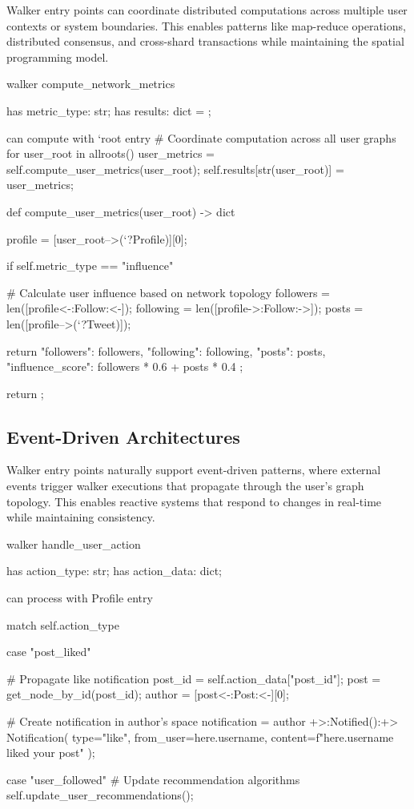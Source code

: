 Walker entry points can coordinate distributed computations across multiple user contexts or system boundaries. This enables patterns like map-reduce operations, distributed consensus, and cross-shard transactions while maintaining the spatial programming model.

\begin{jacblock}
walker compute_network_metrics {
    has metric_type: str;
    has results: dict = {};

    can compute with `root entry {
        # Coordinate computation across all user graphs
        for user_root in allroots() {
            user_metrics = self.compute_user_metrics(user_root);
            self.results[str(user_root)] = user_metrics;
        }
    }

    def compute_user_metrics(user_root) -> dict {
        profile = [user_root-->(`?Profile)][0];

        if self.metric_type == "influence" {
            # Calculate user influence based on network topology
            followers = len([profile<-:Follow:<-]);
            following = len([profile->:Follow:->]);
            posts = len([profile-->(`?Tweet)]);

            return {
                "followers": followers,
                "following": following,
                "posts": posts,
                "influence_score": followers * 0.6 + posts * 0.4
            };
        }

        return {};
    }
}
\end{jacblock}

\subsection{Event-Driven Architectures}

Walker entry points naturally support event-driven patterns, where external events trigger walker executions that propagate through the user's graph topology. This enables reactive systems that respond to changes in real-time while maintaining consistency.

\begin{jacblock}
walker handle_user_action {
    has action_type: str;
    has action_data: dict;

    can process with Profile entry {
        match self.action_type {
            case "post_liked" {
                # Propagate like notification
                post_id = self.action_data["post_id"];
                post = get_node_by_id(post_id);
                author = [post<-:Post:<-][0];

                # Create notification in author's space
                notification = author +>:Notified():+> Notification(
                    type="like",
                    from_user=here.username,
                    content=f"{here.username} liked your post"
                );
            }

            case "user_followed" {
                # Update recommendation algorithms
                self.update_user_recommendations();
            }
        }
    }
}
\end{jacblock}

